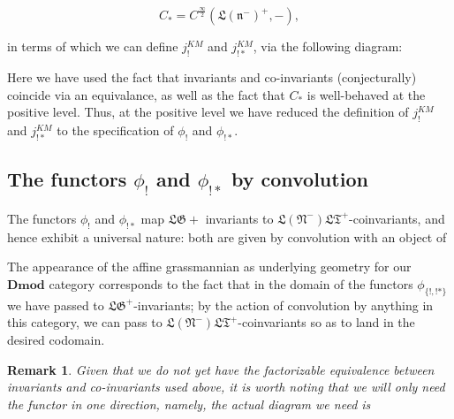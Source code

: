 \documentclass[12pt]{amsart}
\newtheorem{rmk}[thm]{Remark}
\newcommand\LT{\mathfrak{LT}}
\newcommand\LN{\mathfrak{LN}}
\newcommand\LNm{\mathfrak{L}(\mathfrak{N}^-)}
\newcommand\Lnm{\mathfrak{L}(\mathfrak{n}^-)}
\newcommand\LG{\mathfrak{LG}}
\newcommand\afftmod{\hat{\mathfrak{t}}-\mathbf{Mod}}
\newcommand\affgmod{\hat{\mathfrak{g}}-\mathbf{Mod}}
\newcommand\DMod{\mathbf{Dmod}}
\newcommand\Gr{\mathbf{Gr}}
\newcommand\semiinf{\frac{\infty}{2}}
\newcommand\KL{\mathbf{KL}}
\newcommand\poslv{\kappa}
\begin{document}
  $$C_* = C^{\semiinf}(\Lnm^+, -),$$

  in terms of which we can define $j_!^{KM}$ and $j_{!*}^{KM}$, via the following diagram:


  Here we have used the fact that invariants and co-invariants (conjecturally)
  coincide via an equivalance, as well as the fact that $C_*$ is well-behaved at
  the positive level. Thus, at the positive level we have reduced the definition
  of $j_!^{KM}$ and $j_{!*}^{KM}$ to the specification of
  $\phi_!$ and $\phi_{!*}$.

\subsection{The functors $\phi_{!}$ and $\phi_{!*}$ by convolution}
The functors $\phi_!$ and $\phi_{!*}$ map $\LG+$
invariants to $\LNm\LT^+$-coinvariants, and hence exhibit a universal nature:
both are given by convolution with an object of


  The appearance of the affine grassmannian as underlying geometry for our
  $\DMod$ category corresponds to the fact that in the domain of the functors
  $\phi_{\{!,!*\}}$ we have passed to
  $\LG^+$-invariants; by the action of convolution by anything in this category,
  we can pass to $\LNm\LT^+$-coinvariants so as to land in the desired codomain.

  \begin{rmk}
    Given that we do not yet have the factorizable equivalence between
    invariants and co-invariants used above, it is worth noting that we will
    only need the functor in one direction, namely, the actual diagram we need
    is
  \end{rmk}
\end{document}
